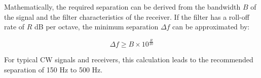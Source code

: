 Mathematically, the required separation can be derived from the bandwidth \( B \) of the signal and the filter characteristics of the receiver. If the filter has a roll-off rate of \( R \) dB per octave, the minimum separation \( \Delta f \) can be approximated by:

\[
\Delta f \geq B \times 10^{\frac{R}{20}}
\]

For typical CW signals and receivers, this calculation leads to the recommended separation of 150 Hz to 500 Hz.

